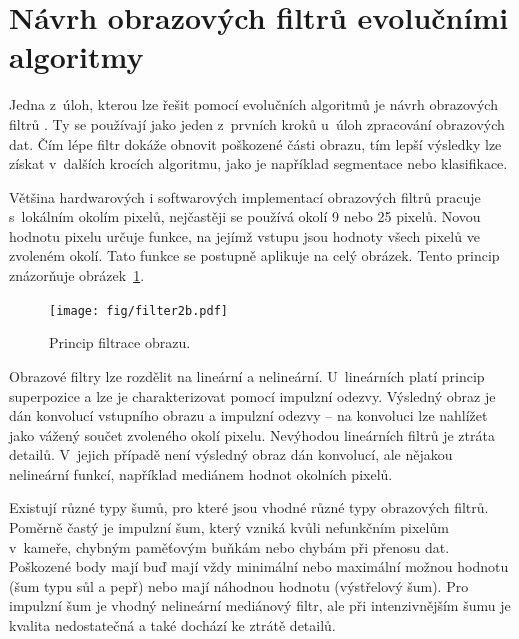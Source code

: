 \section{Návrh obrazových filtrů evolučními algoritmy}
\label{secIF}

Jedna z~úloh, kterou lze řešit pomocí evolučních algoritmů je návrh obrazových filtrů \cite{ZelenaIF}. Ty se používají jako jeden z~prvních kroků u~úloh zpracování obrazových dat. Čím lépe filtr dokáže obnovit poškozené části obrazu, tím lepší výsledky lze získat v~dalších krocích algoritmu, jako je například segmentace nebo klasifikace.

Většina hardwarových i softwarových implementací obrazových filtrů pracuje s~lokálním okolím pixelů, nejčastěji se používá okolí 9 nebo 25 pixelů. Novou hodnotu pixelu určuje funkce, na jejímž vstupu jsou hodnoty všech pixelů ve zvoleném okolí. Tato funkce se postupně aplikuje na celý obrázek. Tento princip znázorňuje obrázek~\ref{obrIFokoli}.

\begin{figure}[htb]
    \centering\texttt{[image: fig/filter2b.pdf]}
    \caption{Princip filtrace obrazu.}
    \label{obrIFokoli}
\end{figure}

Obrazové filtry lze rozdělit na lineární a nelineární. U~lineárních platí princip superpozice a lze je charakterizovat pomocí impulzní odezvy. Výsledný obraz je dán konvolucí vstupního obrazu a impulzní odezvy -- na konvoluci lze nahlížet jako vážený součet zvoleného okolí pixelu. Nevýhodou lineárních filtrů je ztráta detailů. V~jejich případě není výsledný obraz dán konvolucí, ale nějakou nelineární funkcí, například mediánem hodnot okolních pixelů.

Existují různé typy šumů, pro které jsou vhodné různé typy obrazových filtrů. Poměrně častý je impulzní šum, který vzniká kvůli nefunkčním pixelům v~kameře, chybným paměťovým buňkám nebo chybám při přenosu dat. Poškozené body mají buď mají vždy minimální nebo maximální možnou hodnotu (šum typu sůl a pepř) nebo mají náhodnou hodnotu (výstřelový šum). Pro impulzní šum je vhodný nelineární mediánový filtr, ale při intenzivnějším šumu je kvalita nedostatečná a také dochází ke ztrátě detailů.

